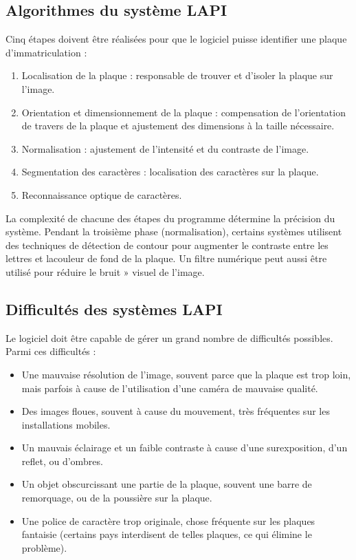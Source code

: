 \documentclass[11pt]{report}
\begin{document}
\subsection{Algorithmes du système LAPI}
Cinq étapes doivent être réalisées pour que le logiciel puisse identifier
une plaque d'immatriculation :

\begin{enumerate}
	\item Localisation de la plaque : responsable de trouver et d'isoler la plaque sur
	l'image.
	\item Orientation et dimensionnement de la plaque : compensation de
	l'orientation de travers de la plaque et ajustement des dimensions à la taille
	nécessaire.
	\item Normalisation : ajustement de l'intensité et du contraste de l'image.
	\item Segmentation des caractères : localisation des caractères sur la plaque.
	\item Reconnaissance optique de caractères.
	
\end{enumerate}

La complexité de chacune des étapes du programme détermine la précision du
système. Pendant la troisième phase (normalisation), certains systèmes utilisent des
techniques de détection de contour pour augmenter le contraste entre les lettres et lacouleur de fond de la plaque. Un filtre numérique peut aussi être utilisé pour réduire
le bruit » visuel de l'image.
\subsection{Difficultés des systèmes LAPI}
Le logiciel doit être capable de gérer un grand nombre de difficultés
possibles.
Parmi ces difficultés :
\begin{itemize}
	\item Une mauvaise résolution de l'image, souvent parce que la plaque est trop
	loin, mais parfois à cause de l'utilisation d'une caméra de mauvaise qualité.
	\item Des images floues, souvent à cause du mouvement, très fréquentes sur les
	installations mobiles.
	\item Un mauvais éclairage et un faible contraste à cause d'une surexposition,
	d'un reflet, ou d'ombres.
	\item Un objet obscurcissant une partie de la plaque, souvent une barre de
	remorquage, ou de la poussière sur la plaque.
	\item Une police de caractère trop originale, chose fréquente sur les plaques
	fantaisie (certains pays interdisent de telles plaques, ce qui élimine le
	problème).
\end{itemize}
\end{document}
